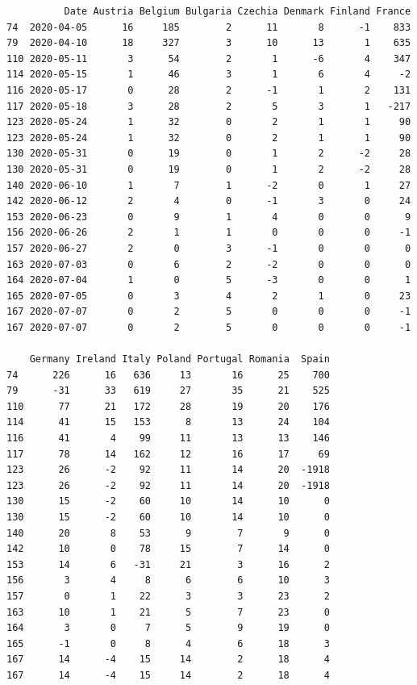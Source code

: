 \documentclass[a4paper]{article}
\begin{document}
    
    \begin{verbatim}
          Date Austria Belgium Bulgaria Czechia Denmark Finland France
74  2020-04-05      16     185        2      11       8      -1    833   
79  2020-04-10      18     327        3      10      13       1    635   
110 2020-05-11       3      54        2       1      -6       4    347   
114 2020-05-15       1      46        3       1       6       4     -2   
116 2020-05-17       0      28        2      -1       1       2    131   
117 2020-05-18       3      28        2       5       3       1   -217   
123 2020-05-24       1      32        0       2       1       1     90   
123 2020-05-24       1      32        0       2       1       1     90   
130 2020-05-31       0      19        0       1       2      -2     28   
130 2020-05-31       0      19        0       1       2      -2     28   
140 2020-06-10       1       7        1      -2       0       1     27   
142 2020-06-12       2       4        0      -1       3       0     24   
153 2020-06-23       0       9        1       4       0       0      9   
156 2020-06-26       2       1        1       0       0       0     -1   
157 2020-06-27       2       0        3      -1       0       0      0   
163 2020-07-03       0       6        2      -2       0       0      0   
164 2020-07-04       1       0        5      -3       0       0      1   
165 2020-07-05       0       3        4       2       1       0     23   
167 2020-07-07       0       2        5       0       0       0     -1   
167 2020-07-07       0       2        5       0       0       0     -1   

    Germany Ireland Italy Poland Portugal Romania  Spain  
74      226      16   636     13       16      25    700  
79      -31      33   619     27       35      21    525  
110      77      21   172     28       19      20    176  
114      41      15   153      8       13      24    104  
116      41       4    99     11       13      13    146  
117      78      14   162     12       16      17     69  
123      26      -2    92     11       14      20  -1918  
123      26      -2    92     11       14      20  -1918  
130      15      -2    60     10       14      10      0  
130      15      -2    60     10       14      10      0  
140      20       8    53      9        7       9      0  
142      10       0    78     15        7      14      0  
153      14       6   -31     21        3      16      2  
156       3       4     8      6        6      10      3  
157       0       1    22      3        3      23      2  
163      10       1    21      5        7      23      0  
164       3       0     7      5        9      19      0  
165      -1       0     8      4        6      18      3  
167      14      -4    15     14        2      18      4  
167      14      -4    15     14        2      18      4  
    \end{verbatim}
\end{document}
